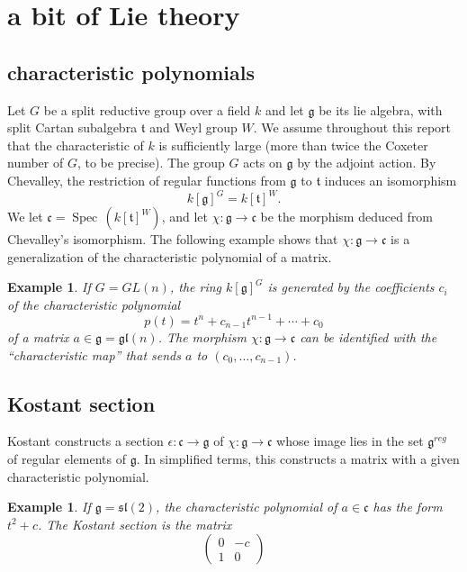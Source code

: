\documentclass[brochure,english,12pt]{bourbaki}
\newtheorem{example}[equation]{Example}
\def\op#1{{\operatorname{#1}}}
\def\gl{\mathfrak{gl}}
\def\sl{\mathfrak{sl}}
\def\g{\mathfrak{g}}
\def\t{\mathfrak{t}}
\def\cc{\mathfrak{c}}
\begin{document}
\section{a bit of Lie theory}



\subsection{characteristic polynomials}\label{sec:chevalley}



Let $G$ be a split reductive group over a field $k$ and let
$\g$ be its lie algebra, with split Cartan subalgebra $\t$ and Weyl
group $W$.  We assume throughout this report that the characteristic of $k$ is sufficiently
large (more than twice the Coxeter number of $G$, to be precise).  The group
$G$ acts on $\g$ by the adjoint action.  By Chevalley,  the restriction  of regular
functions from $\g$ to $\t$ induces an isomorphism
\[
k[\g]^G = k[\t]^W.
\]
We let $\cc =  \op{Spec}\,(k[\t]^W)$, and let $\chi:\g\to\cc$ be the morphism deduced from
Chevalley's isomorphism.  The following example shows that $\chi:\g\to\cc$ is a generalization
of the characteristic polynomial of a matrix.

\begin{example}
If $G=GL(n)$, the ring $k[\g]^G$ is generated by the coefficients $c_i$ of the characteristic
polynomial 
\begin{equation}
p(t)=t^n + c_{n-1} t^{n-1} +\cdots +c_0
\end{equation}
of a matrix $a\in \g=\gl(n)$.  The morphism $\chi:\g\to\cc$ can be identified with
the ``characteristic map'' that sends $a$ to $(c_0,\ldots,c_{n-1})$.
\end{example}


\subsection{Kostant section}

Kostant constructs a section $\epsilon:\cc\to\g$ of $\chi:\g\to\cc$ whose image lies in the set $\g^{reg}$ 
of regular elements
of $\g$.  In simplified terms, this constructs a matrix with a given characteristic polynomial.


\begin{example}
If $\g=\sl(2)$, the characteristic polynomial of $a\in\cc$ has the form $t^2  +c$.
The Kostant section is the matrix
\[
\begin{pmatrix} 0 & -c\\ 1 & 0\end{pmatrix}
\]
\end{example}
\end{document}

